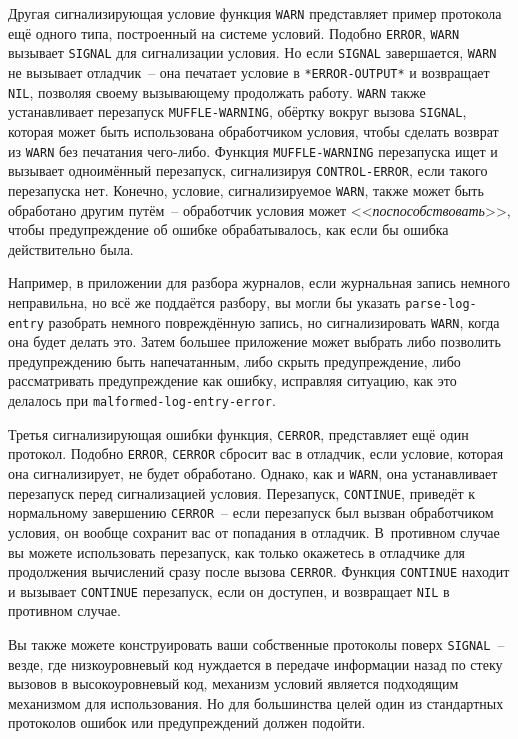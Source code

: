 Другая сигнализирующая условие функция \lstinline{WARN} представляет пример протокола ещё
одного типа, построенный на системе условий. Подобно \lstinline{ERROR}, \lstinline{WARN}
вызывает \lstinline{SIGNAL} для сигнализации условия. Но если \lstinline{SIGNAL}
завершается, \lstinline{WARN} не вызывает отладчик~-- она печатает условие в
\lstinline{*ERROR-OUTPUT*} и возвращает \lstinline{NIL}, позволяя своему вызывающему
продолжать работу. \lstinline{WARN} также устанавливает перезапуск
\lstinline{MUFFLE-WARNING}, обёртку вокруг вызова \lstinline{SIGNAL}, которая может быть
использована обработчиком условия, чтобы сделать возврат из \lstinline{WARN} без печатания
чего-либо. Функция \lstinline{MUFFLE-WARNING} перезапуска ищет и вызывает одноимённый
перезапуск, сигнализируя \lstinline{CONTROL-ERROR}, если такого перезапуска нет. Конечно,
условие, сигнализируемое \lstinline{WARN}, также может быть обработано другим путём~--
обработчик условия может <<\textit{поспособствовать}>>, чтобы предупреждение об ошибке
обрабатывалось, как если бы ошибка действительно была.

Например, в приложении для разбора журналов, если журнальная запись немного неправильна, но
всё же поддаётся разбору, вы могли бы указать \lstinline{parse-log-entry} разобрать немного
повреждённую запись, но сигнализировать \lstinline{WARN}, когда она будет делать это. Затем
большее приложение может выбрать либо позволить предупреждению быть напечатанным, либо
скрыть предупреждение, либо рассматривать предупреждение как ошибку, исправляя ситуацию,
как это делалось при \lstinline{malformed-log-entry-error}.

Третья сигнализирующая ошибки функция, \lstinline{CERROR}, представляет ещё один протокол.
Подобно \lstinline{ERROR}, \lstinline{CERROR} сбросит вас в отладчик, если условие, которая она
сигнализирует, не будет обработано. Однако, как и \lstinline{WARN}, она устанавливает перезапуск
перед сигнализацией условия. Перезапуск, \lstinline{CONTINUE}, приведёт к нормальному
завершению \lstinline{CERROR}~-- если перезапуск был вызван обработчиком условия, он вообще
сохранит вас от попадания в отладчик. В~противном случае вы можете использовать
перезапуск, как только окажетесь в отладчике для продолжения вычислений сразу после вызова
\lstinline{CERROR}. Функция \lstinline{CONTINUE} находит и вызывает \lstinline{CONTINUE} перезапуск, если
он доступен, и возвращает \lstinline{NIL} в противном случае.

Вы также можете конструировать ваши собственные протоколы поверх \lstinline{SIGNAL}~-- везде,
где низкоуровневый код нуждается в передаче информации назад по стеку вызовов в
высокоуровневый код, механизм условий является подходящим механизмом для использования. Но
для большинства целей один из стандартных протоколов ошибок или предупреждений должен
подойти.

